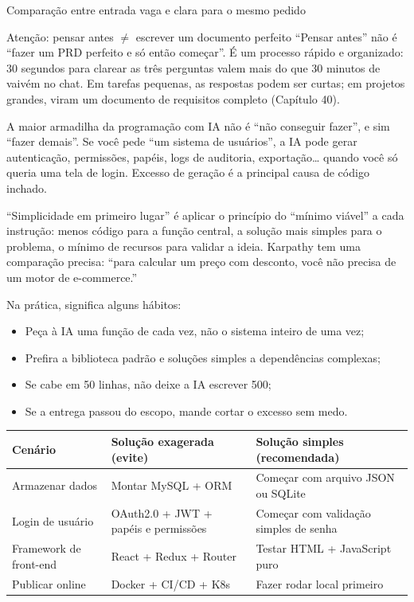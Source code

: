 \begin{center}\small\color{gray}Comparação entre entrada vaga e clara para o mesmo pedido\end{center}

\begin{tcbwarn}{Atenção: pensar antes $\neq$ escrever um documento perfeito}
“Pensar antes” não é “fazer um PRD perfeito e só então começar”. É um processo rápido e organizado: 30 segundos para clarear as três perguntas valem mais do que 30 minutos de vaivém no chat. Em tarefas pequenas, as respostas podem ser curtas; em projetos grandes, viram um documento de requisitos completo (Capítulo 40).

\end{tcbwarn}


A maior armadilha da programação com IA não é “não conseguir fazer”, e sim “fazer demais”. Se você pede “um sistema de usuários”, a IA pode gerar autenticação, permissões, papéis, logs de auditoria, exportação… quando você só queria uma tela de login. Excesso de geração é a principal causa de código inchado.

“Simplicidade em primeiro lugar” é aplicar o princípio do “mínimo viável” a cada instrução: menos código para a função central, a solução mais simples para o problema, o mínimo de recursos para validar a ideia. Karpathy tem uma comparação precisa: “para calcular um preço com desconto, você não precisa de um motor de e-commerce.”

Na prática, significa alguns hábitos:

\begin{itemize}
  \item Peça à IA uma função de cada vez, não o sistema inteiro de uma vez;
  \item Prefira a biblioteca padrão e soluções simples a dependências complexas;
  \item Se cabe em 50 linhas, não deixe a IA escrever 500;
  \item Se a entrega passou do escopo, mande cortar o excesso sem medo.
\end{itemize}

\begin{center}
\begin{tabularx}{\linewidth}{|X|X|X|}
\hline
\textbf{Cenário} & \textbf{Solução exagerada (evite)} & \textbf{Solução simples (recomendada)} \tabularnewline
\hline
Armazenar dados & Montar MySQL + ORM & Começar com arquivo JSON ou SQLite \tabularnewline
Login de usuário & OAuth2.0 + JWT + papéis e permissões & Começar com validação simples de senha \tabularnewline
Framework de front-end & React + Redux + Router & Testar HTML + JavaScript puro \tabularnewline
Publicar online & Docker + CI/CD + K8s & Fazer rodar local primeiro \tabularnewline
\hline
\end{tabularx}
\end{center}

